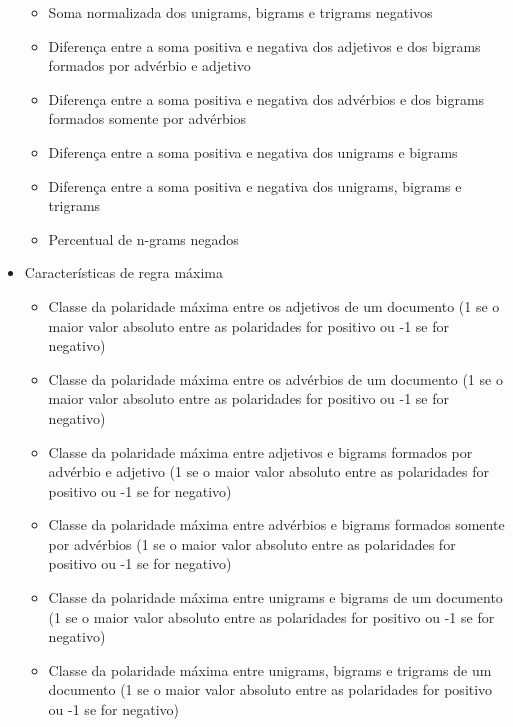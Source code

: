 \begin{itemize}
\begin{itemize}
\item Soma normalizada dos unigrams, bigrams e trigrams negativos
\item Diferença entre a soma positiva e negativa dos adjetivos e dos bigrams formados por advérbio e adjetivo
\item Diferença entre a soma positiva e negativa dos advérbios e dos bigrams formados somente por advérbios
\item Diferença entre a soma positiva e negativa dos unigrams e bigrams
\item Diferença entre a soma positiva e negativa dos unigrams, bigrams e trigrams
\item Percentual de n-grams negados
\end{itemize}

\item Características de regra máxima %
\begin{itemize}
\item Classe da polaridade máxima entre os adjetivos de um documento (1 se o maior valor absoluto entre as polaridades for positivo ou -1 se for negativo)
\item Classe da polaridade máxima entre os advérbios de um documento (1 se o maior valor absoluto entre as polaridades for positivo ou -1 se for negativo)
\item Classe da polaridade máxima entre adjetivos e bigrams formados por advérbio e adjetivo (1 se o maior valor absoluto entre as polaridades for positivo ou -1 se for negativo)
\item Classe da polaridade máxima entre advérbios e bigrams formados somente por advérbios (1 se o maior valor absoluto entre as polaridades for positivo ou -1 se for negativo)
\item Classe da polaridade máxima entre unigrams e bigrams de um documento (1 se o maior valor absoluto entre as polaridades for positivo ou -1 se for negativo)
\item Classe da polaridade máxima entre unigrams, bigrams e trigrams de um documento (1 se o maior valor absoluto entre as polaridades for positivo ou -1 se for negativo)
\end{itemize}
\end{itemize}